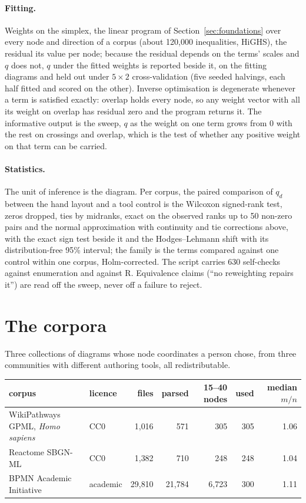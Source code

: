 \documentclass[11pt]{article}
\begin{document}
\paragraph{Fitting.} Weights on the simplex, the linear program of Section~\ref{sec:foundations} over every node and direction of a corpus (about 120{,}000 inequalities, HiGHS), the residual its value per node; because the residual depends on the terms' scales and $q$ does not, $q$ under the fitted weights is reported beside it, on the fitting diagrams and held out under $5 \times 2$ cross-validation (five seeded halvings, each half fitted and scored on the other). Inverse optimisation is degenerate whenever a term is satisfied exactly: overlap holds every node, so any weight vector with all its weight on overlap has residual zero and the program returns it. The informative output is the sweep, $q$ as the weight on one term grows from 0 with the rest on crossings and overlap, which is the test of whether any positive weight on that term can be carried.

\paragraph{Statistics.} The unit of inference is the diagram. Per corpus, the paired
comparison of $q_d$ between the hand layout and a tool control is the Wilcoxon signed-rank
test, zeros dropped, ties by midranks, exact on the observed ranks up to 50 non-zero pairs
and the normal approximation with continuity and tie corrections above, with the exact sign
test beside it and the Hodges--Lehmann shift with its distribution-free 95\% interval; the
family is the terms compared against one control within one corpus, Holm-corrected. The
script carries 630 self-checks against enumeration and against R. Equivalence claims (``no
reweighting repairs it'') are read off the sweep, never off a failure to reject.


\section{The corpora}\label{sec:corpora}


Three collections of diagrams whose node coordinates a person chose, from three communities
with different authoring tools, all redistributable.

\begin{center}\footnotesize
\begin{tabular}{llrrrrr}
\toprule
corpus & licence & files & parsed & 15--40 nodes & used & median $m/n$ \\
\midrule
WikiPathways GPML, \emph{Homo sapiens} & CC0 & 1{,}016 & 571 & 305 & 305 & 1.06 \\
Reactome SBGN-ML & CC0 & 1{,}382 & 710 & 248 & 248 & 1.04 \\
BPMN Academic Initiative & academic & 29{,}810 & 21{,}784 & 6{,}723 & 300 & 1.11 \\
\bottomrule
\end{tabular}
\end{center}
\end{document}
